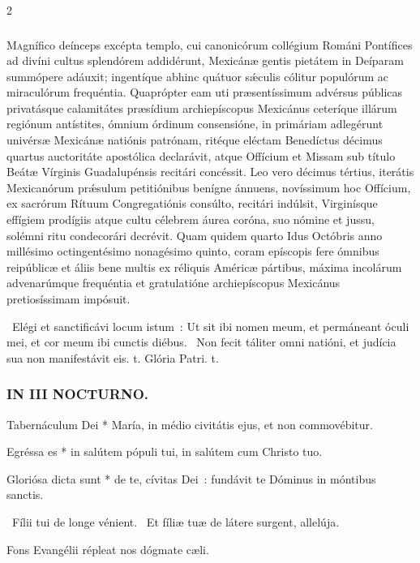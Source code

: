 \documentclass[9pt,twoside]{extarticle}
\begin{document}
\begin{multicols}{2}
\subsubsection*{\center {}}
\lettrine{M}agnífico deínceps excépta templo, cui canonicórum collégium Románi Pontífices ad divíni cultus splendórem addidérunt, Mexicánæ gentis pietátem in Deíparam summópere adáuxit; ingentíque abhinc quátuor sǽculis cólitur populórum ac miraculórum frequéntia. Quaprópter eam uti præsentíssimum advérsus públicas privatásque calamitátes præsídium archiepíscopus Mexicánus ceteríque illárum regiónum antístites, ómnium órdinum consensióne, in primáriam adlegérunt univérsæ Mexicánæ natiónis patrónam, ritéque eléctam Benedíctus décimus quartus auctoritáte apostólica declarávit, atque Offícium et Missam sub título Beátæ Vírginis Guadalupénsis recitári concéssit. Leo vero décimus tértius, iterátis Mexicanórum prǽsulum petitiónibus benígne ánnuens, novíssimum hoc Offícium, ex sacrórum Rítuum Congregatiónis consúlto, recitári indúlsit, Virginísque effígiem prodígiis atque cultu célebrem áurea coróna, suo nómine et jussu, solémni ritu condecorári decrévit. Quam quidem quarto Idus Octóbris anno millésimo octingentésimo nonagésimo quinto, coram epíscopis fere ómnibus reipúblicæ et áliis bene multis ex réliquis Américæ pártibus, máxima incolárum advenarúmque frequéntia et gratulatióne archiepíscopus Mexicánus pretiosíssimam impósuit.

\begin{tightlist}{}
\item {}~Elégi et sanctificávi locum istum~: \textred{*} Ut sit ibi nomen meum, et permáneant óculi mei, et cor meum ibi cunctis diébus.
~Non fecit táliter omni natióni, et judícia sua non manifestávit eis. t. Glória Patri. t.
\end{tightlist}

\subsubsection*{\center \textsc{IN III NOCTURNO.}}
\begin{tightlist}{}
\item {} Tabernáculum Dei * María, in médio civitátis ejus, et non commovébitur.
\item {} Egréssa es * in salútem pópuli tui, in salútem cum Christo tuo.
\item {} Gloriósa dicta sunt * de te, cívitas Dei~: fundávit te Dóminus in móntibus sanctis.
\item {}~Fílii tui de longe vénient. ~Et fíliæ tuæ de látere surgent, allelúja.
\item {\small {} Fons Evangélii répleat nos dógmate cæli.}
\end{tightlist}


\end{multicols}
\end{document}
